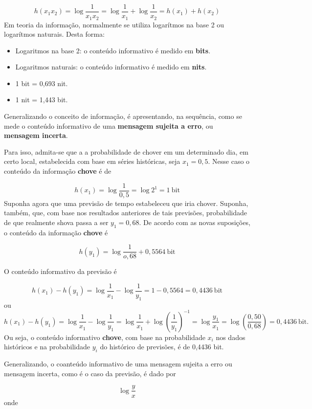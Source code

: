 \documentclass[
]{book}
\begin{document}
\[
  h(x_1x_2) = \log \dfrac{1}{x_1x_2} = \log\dfrac{1}{x_1} + \log \dfrac{1}{x_2} = h(x_1) + h(x_2)
\]
Em teoria da informação, normalmente se utiliza logarítmos na base 2 ou logarítmos naturais. Desta forma:

\begin{itemize}
\item
  Logaritmos na base 2: o conteúdo informativo é medido em \textbf{bits}.
\item
  Logaritmos naturais: o conteúdo informativo é medido em \textbf{nits}.
\item
  1 bit = 0,693 nit.
\item
  1 nit = 1,443 bit.
\end{itemize}

Generalizando o conceito de informação, é apresentando, na sequência, como se mede o conteúdo informativo de uma \textbf{mensagem sujeita a erro}, ou \textbf{mensagem incerta}.

Para isso, admita-se que a a probabilidade de chover em um determinado dia, em certo local, estabelecida com base em séries históricas, seja \(x_1 = 0,5\). Nesse caso o conteúdo da informação \textbf{chove} é de

\[
  h(x_1) = \log\dfrac{1}{0,5} =\log 2^1 = 1~\text{bit}
\]
Suponha agora que uma previsão de tempo estabeleceu que iria chover. Suponha, também, que, com base nos resultados anteriores de tais previsões, probabilidade de que realmente shova passa a ser \(y_1 = 0,68\). De acordo com as novas suposições, o conteúdo da informação \textbf{chove} é

\[
  h(y_1) = \log\dfrac{1}{o,68} + 0,5564~\text{bit}
\]

O conteúdo informativo da previsão é

\[
  h(x_1) - h(y_1) = \log\dfrac{1}{x_1} - \log\dfrac{1}{y_1} =  1 - 0,5564 = 0,4436~\text{bit}
\]
ou
\[
  h(x_1) - h(y_1) = \log\dfrac{1}{x_1} - \log\dfrac{1}{y_1} = \log\dfrac{1}{x_1} + \log \left(\dfrac{1}{y_1}\right)^{-1} = \log\dfrac{y_1}{x_1} = \log\left(\dfrac{0,50}{0,68}\right)  = 0,4436~\text{bit}.
\]
Ou seja, o conteúdo informativo \textbf{chove}, com base na probabilidade \(x_i\) nos dados históricos e na probabilidade \(y_i\) do histórico de previsões, é de 0,4436 bit.

Generalizando, o coanteúdo informativo de uma mensagem sujeita a erro ou mensagem incerta, como é o caso da previsão, é dado por

\[
  \log \dfrac{y}{x}
  \label{eq:ConteudoInformativoGeral}
\]
onde
\end{document}
